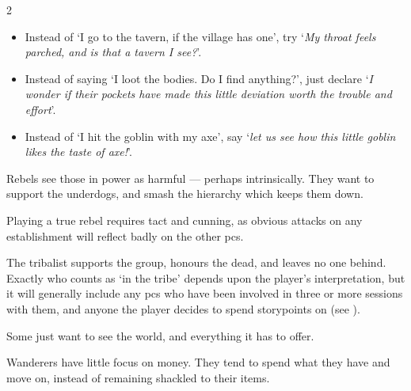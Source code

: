 \begin{multicols}{2}
\begin{itemize}
  \item
  Instead of `I go to the tavern, if the \gls{village} has one', try `\textit{My throat feels parched, and is that a tavern I see?}'.
  \item
  Instead of saying `I loot the bodies. Do I find anything?', just declare `\textit{I wonder if their pockets have made this little deviation worth the trouble and effort}'.
  \item
  Instead of `I hit the goblin with my axe', say `\textit{let us see how this little goblin likes the taste of axe!}'.
\end{itemize}


Rebels see those in power as harmful --- perhaps intrinsically.
They want to support the underdogs, and smash the hierarchy which keeps them down.

Playing a true rebel requires tact and cunning, as obvious attacks on any establishment will reflect badly on the other \glspl{pc}.

\showCodeValues


The tribalist supports the group, honours the dead, and leaves no one behind.
Exactly who counts as `in the tribe' depends upon the player's interpretation, but it will generally include any \glspl{pc} who have been involved in three or more sessions with them, and anyone the player decides to spend \glspl{storypoint} on (see ).

\showCodeValues


Some just want to see the world, and everything it has to offer.

Wanderers have little focus on money.
They tend to spend what they have and move on, instead of remaining shackled to their items.

\showCodeValues

\end{multicols}

\section{}
\label{xpCosts}

